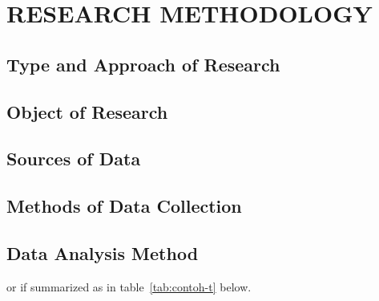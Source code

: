 \chapter{RESEARCH METHODOLOGY}
	\section{Type and Approach of Research}
	\setlength{\leftskip}{0.7cm}
	\lipsum[3]		
	\section{Object of Research}
	\lipsum[3]
	\section{Sources of Data}
	\lipsum[3]
	\section{Methods of Data Collection}
	\lipsum[3]
	\section{Data Analysis Method}	
	\lipsum[3]
	or if summarized as in table~\ref{tab:contoh-t} below.
	\contohtabel